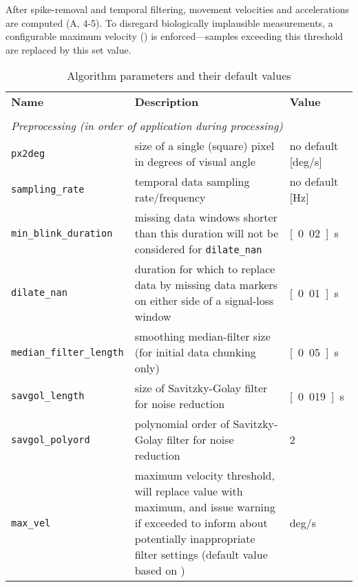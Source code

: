 After spike-removal and temporal filtering, movement velocities and
accelerations are computed (A, 4-5). To
disregard biologically implausible measurements, a configurable maximum
velocity () is enforced---samples exceeding this threshold
are replaced by this set value.

\begin{table*}[tbp]
  \caption{Algorithm parameters and their default values}
  \label{tab:parameters}
  \small
  \begin{tabular}{lp{85mm}l}
    \textbf{Name} & \textbf{Description} & \textbf{Value} \\
    & & \\
    \multicolumn{3}{l}{\textit{Preprocessing (in order of application during processing)}} \\
    \texttt{px2deg} &
    size of a single (square) pixel in degrees of visual angle &
    no default [\unit{deg/s}]\\
    \texttt{sampling\_rate} &
    temporal data sampling rate/frequency &
    no default [\unit{Hz}]\\
    \texttt{min\_blink\_duration} &
    missing data windows shorter than this duration will not be considered for \texttt{dilate\_nan}&
    \unit[0.02]{s}\\
    \texttt{dilate\_nan} &
    duration for which to replace data by missing data markers on either side of a
    signal-loss window &
    \unit[0.01]{s}\\
    \texttt{median\_filter\_length} &
    smoothing median-filter size (for initial data chunking only) &
    \unit[0.05]{s}\\
    \texttt{savgol\_length} &
    size of Savitzky-Golay filter for noise reduction&
    \unit[0.019]{s}\\
    \texttt{savgol\_polyord} &
    polynomial order of Savitzky-Golay filter for noise reduction&
    2\\
    \texttt{max\_vel} &
    maximum velocity threshold, will replace value with maximum, and issue
    warning if exceeded to inform about
    potentially inappropriate filter settings
    (default value based on \cite{holmqvist2011eye})&
    \unit[1000]{deg/s}\\


\end{tabular}
\end{table*}
